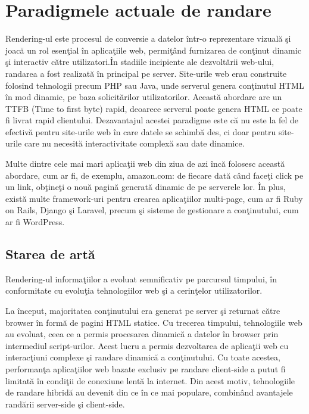 \documentclass[12pt, a4paper]{report}
\begin{document}
\chapter{Paradigmele actuale de randare}
Rendering-ul este procesul de conversie a datelor \^intr-o reprezentare vizual\u a \c si joac\u a un rol esen\c tial \^in aplica\c tiile web, permi\c t\^and furnizarea de con\c tinut dinamic \c si interactiv c\u atre utilizatori.\^In stadiile incipiente ale dezvolt\u arii web-ului, randarea a fost realizat\u a \^in principal pe server. Site-urile web erau construite folosind tehnologii precum PHP sau Java, unde serverul genera con\c tinutul HTML \^in mod dinamic, pe baza solicit\u arilor utilizatorilor. Aceast\u a abordare are un TTFB (Time to first byte) rapid, deoarece serverul poate genera HTML ce poate fi livrat rapid clientului. Dezavantajul acestei paradigme este c\u a nu este la fel de efectiv\u a pentru site-urile web \^ in care datele se schimb\u a des, ci doar pentru site-urile care nu necesit\u a interactivitate complex\u a sau date dinamice. \cite{benefitsserverrendering}

Multe dintre cele mai mari aplica\c tii web din ziua de azi \^ inc\u a folosesc aceast\u a abordare, cum ar fi, de exemplu, amazon.com: de fiecare dat\u a c\^ and face\c ti click pe un link, ob\c tine\c ti o nou\u a pagin\u a generat\u a dinamic de pe serverele lor. \^ In plus, exist\u a multe framework-uri pentru crearea  aplica\c tiilor multi-page, cum ar fi Ruby on Rails, Django \c si Laravel, precum \c si sisteme de gestionare a con\c tinutului, cum ar fi WordPress. 

\section{Starea de art\u a}

Rendering-ul informa\c tiilor a evoluat semnificativ pe parcursul timpului, \^ in conformitate cu evolu\c tia tehnologiilor web \c si a cerin\c telor utilizatorilor.

La \^ inceput, majoritatea con\c tinutului era generat pe server \c si returnat c\u atre browser \^ in form\u a de pagini HTML statice. Cu trecerea timpului, tehnologiile web au evoluat, ceea ce a permis procesarea dinamic\u a a datelor \^in browser prin intermediul script-urilor. Acest lucru a permis dezvoltarea de aplica\c tii web cu interac\c tiuni complexe \c si randare dinamic\u a a con\c tinutului. Cu toate acestea, performan\c ta aplica\c tiilor web bazate exclusiv pe randare client-side a putut fi limitat\u a \^ in condi\c tii de conexiune lent\u a la internet. Din acest motiv, tehnologiile de randare hibrid\u a au devenit din ce \^ in ce mai populare, combin\^ and avantajele rand\u arii server-side \c si client-side. \cite{html}
\end{document}
